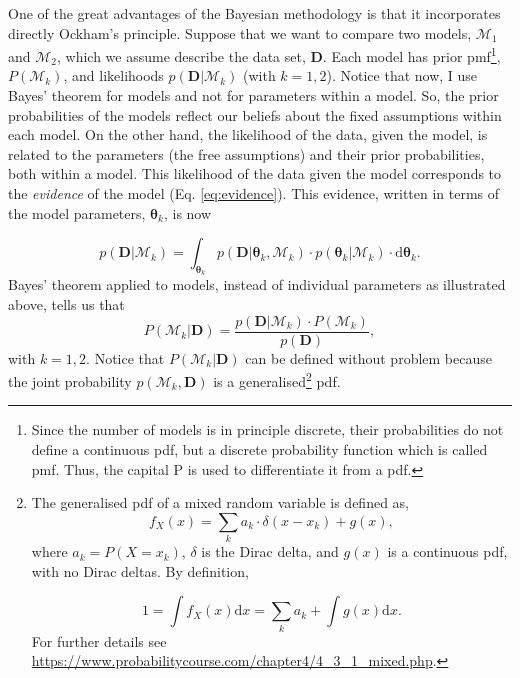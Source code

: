 One of the great advantages of the Bayesian methodology is that it incorporates directly Ockham's principle. Suppose that we want to compare two models, $\mathcal{M}_1$ and $\mathcal{M}_2$, which we assume describe the data set, $\mathbf{D}$. Each model has prior \gls{pmf}\footnote{Since the number of models is in principle discrete, their probabilities do not define a continuous \gls{pdf}, but a discrete probability function which is called \gls{pmf}. Thus, the capital P is used to differentiate it from a \gls{pdf}.}, $P(\mathcal{M}_k)$, and likelihoods $p(\mathbf{D}|\mathcal{M}_k)$ (with $k=1,2$). Notice that now, I use Bayes' theorem for models and not for parameters within a model. So, the prior probabilities of the models reflect our beliefs about the fixed assumptions within each model. On the other hand, the likelihood of the data, given the model, is related to the parameters (the free assumptions) and their prior probabilities, both within a model. This likelihood of the data given the model corresponds to the \emph{evidence} of the model (Eq. \ref{eq:evidence}). This evidence, written in terms of the model parameters, $\boldsymbol{\theta}_k$, is now

 \begin{equation}
p(\mathbf{D}|\mathcal{M}_k)=\int_{\boldsymbol{\theta}_k} p(\mathbf{D}|\boldsymbol{\theta}_k,\mathcal{M}_k)\cdot p(\boldsymbol{\theta}_k|\mathcal{M}_k)\cdot \mathrm{d}\boldsymbol{\theta}_k. \label{eq:evidence2}
\end{equation}
Bayes' theorem applied to models, instead of individual parameters as illustrated above, tells us that
\begin{equation}
P(\mathcal{M}_k|\mathbf{D})=\frac{p(\mathbf{D}|\mathcal{M}_k)\cdot P(\mathcal{M}_k)}{p(\mathbf{D})},
\end{equation}
with $k=1,2$. Notice that $P(\mathcal{M}_k|\mathbf{D})$ can be defined without problem because the joint probability $p(\mathcal{M}_k,\mathbf{D})$ is a generalised\footnote{The generalised \gls{pdf} of a mixed random variable is defined as,
\begin{equation}
f_X(x)=\sum_k a_k\cdot \delta (x- x_k) + g(x), \nonumber
\end{equation}
where $a_k = P(X = x_k)$, $\delta$ is the Dirac delta, and $g(x)$ is a continuous \gls{pdf}, with no Dirac deltas. By definition,

\begin{equation}
1=\int f_X(x) \mathrm{d}x=\sum_k a_k + \int g(x)\mathrm{d}x. \nonumber
\end{equation}
For further details see \url{https://www.probabilitycourse.com/chapter4/4_3_1_mixed.php}.
} \gls{pdf}. 

